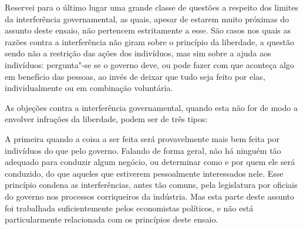  Reservei para o último lugar uma grande classe de questões a respeito
dos limites da interferência governamental, as quais, apesar de estarem
muito próximas do assunto deste ensaio, não pertencem estritamente a
esse. São casos nos quais as razões contra a interferência não giram
sobre o princípio da liberdade, a questão sendo não a restrição das
ações dos indivíduos, mas sim sobre a ajuda aos indivíduos:
pergunta"-se se o governo deve, ou pode fazer com que aconteça algo em
benefício das pessoas, ao invés de deixar que tudo seja feito por elas,
individualmente ou em combinação voluntária. 

As objeções contra a interferência governamental, quando esta não for de
modo a envolver infrações da liberdade, podem ser de três tipos: 

A primeira quando a coisa a ser feita será provavelmente
mais bem feita por indivíduos do que pelo governo. Falando de forma
geral, não há ninguém tão adequado para conduzir algum negócio, ou
determinar como e por quem ele será conduzido, do que aqueles que
estiverem pessoalmente interessados nele. Esse princípio condena as
interferências, antes tão comuns, pela legislatura por oficiais do
governo nos processos corriqueiros da indústria. Mas esta parte deste assunto
foi trabalhada suficientemente pelos economistas políticos, e não está
particularmente relacionada com os princípios deste ensaio.

